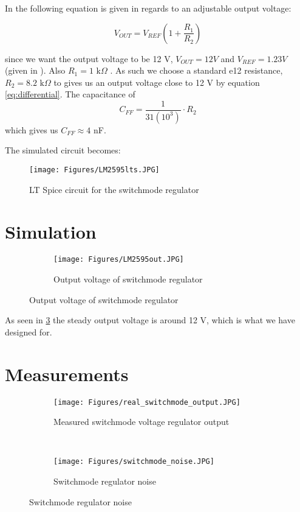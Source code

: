 In \cite{TI:LM2595} the following equation is given in regards to an adjustable output voltage: 

\begin{equation}
    V_{OUT} = V_{REF}(1 + \frac{R_1}{R_2})
    \label{eq:differential}
\end{equation}

since we want the output voltage to be 12 V, $V_{OUT} = 12 V$ and $V_{REF} = 1.23 V$ (given in \cite{TI:LM2595}). Also $R_1 = 1 \text{ k} \Omega$ . As such we choose a standard e12 resistance, $R_2 = 8.2  \text{ k} \Omega$ to gives us an output voltage close to 12 V by equation \ref{eq:differential}.
The capacitance of 
\begin{equation}
    C_{FF} = \frac{1}{31(10^3)} \cdot R_2
    \label{eq:cap}
\end{equation} 
which gives us $C_{FF} \approx 4$ nF.

The simulated circuit becomes:

\begin{figure}[h]
    \centering
    \texttt{[image: Figures/LM2595lts.JPG]}
    \caption{LT Spice circuit for the switchmode regulator} 
    \label{fig:adjustable_LM2595_sim}
\end{figure}


\section{Simulation} \label{sec:simulation_switchmode}

\begin{figure}[H]
\centering
\begin{subfigure}{.5\textwidth}
  \centering
  \texttt{[image: Figures/LM2595out.JPG]}
  \caption{Output voltage of switchmode regulator}
  \label{fig:switch_sim_out}
\end{subfigure}
\end{figure}

As seen in \ref{fig:switch_sim_out} the steady output voltage is around 12 V, which is what we have designed for.

\section{Measurements} \label{sec:measurements_switchmode}

\begin{figure}[H]
\centering
\begin{subfigure}{.5\textwidth}
  \texttt{[image: Figures/real\_switchmode\_output.JPG]}
  \centering
  \caption{Measured switchmode voltage regulator output}
  \label{fig:Switch_out_real}
\end{subfigure}
\\
\begin{subfigure}{.5\textwidth}
\centering
  \texttt{[image: Figures/switchmode\_noise.JPG]}
  \centering
  \caption{Switchmode regulator noise}
  \label{fig:switch_noise}
\end{subfigure}
\end{figure}

